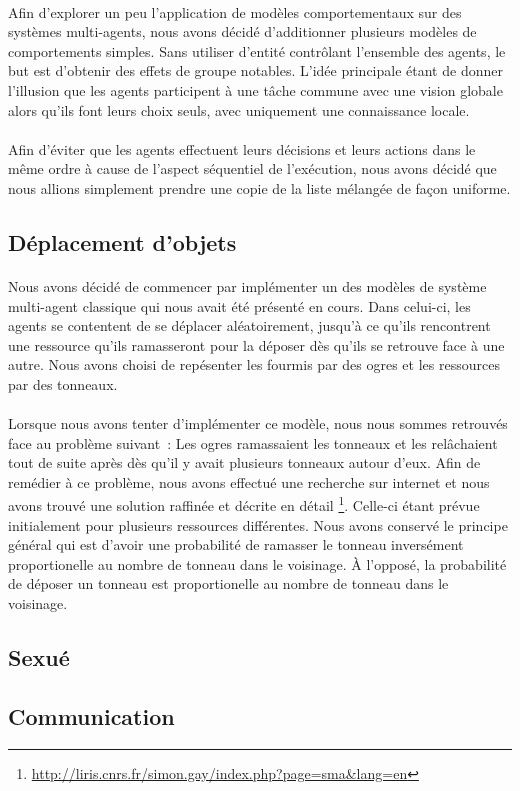 \paragraph{}
Afin d'explorer un peu l'application de modèles comportementaux sur des
systèmes multi-agents, nous avons décidé d'additionner plusieurs modèles
de comportements simples. Sans utiliser d'entité contrôlant l'ensemble des
agents, le but est d'obtenir des effets de groupe notables. L'idée principale
étant de donner l'illusion que les agents participent à une tâche commune
avec une vision globale alors qu'ils font leurs choix seuls, avec uniquement
une connaissance locale.

\paragraph{}
Afin d'éviter que les agents effectuent leurs décisions et leurs actions dans
le même ordre à cause de l'aspect séquentiel de l'exécution, nous avons décidé
que nous allions simplement prendre une copie de la liste mélangée de façon
uniforme.

\subsection{Déplacement d'objets}
\paragraph{}
Nous avons décidé de commencer par implémenter un des modèles de système
multi-agent classique qui nous avait été présenté en cours. Dans celui-ci, les
agents se contentent de se déplacer aléatoirement, jusqu'à ce qu'ils
rencontrent une ressource qu'ils ramasseront pour la déposer dès qu'ils se
retrouve face à une autre. Nous avons choisi de repésenter les fourmis par des
ogres et les ressources par des tonneaux.

\paragraph{}
Lorsque nous avons tenter d'implémenter ce modèle, nous nous sommes retrouvés
face au problème suivant~: Les ogres ramassaient les tonneaux et les
relâchaient tout de suite après dès qu'il y avait plusieurs tonneaux autour
d'eux. Afin de remédier à ce problème, nous avons effectué une recherche sur
internet et nous avons trouvé une solution raffinée et décrite en détail
\footnote{\url{http://liris.cnrs.fr/simon.gay/index.php?page=sma&lang=en}}. Celle-ci
étant prévue initialement pour plusieurs ressources différentes. Nous avons
conservé le principe général qui est d'avoir une probabilité de ramasser le
tonneau inversément proportionelle au nombre de tonneau dans le voisinage. À
l'opposé, la probabilité de déposer un tonneau est proportionelle au nombre
de tonneau dans le voisinage. 

\subsection{Sexué}
\subsection{Communication}
